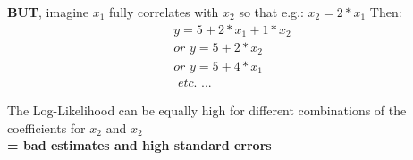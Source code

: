 \documentclass{beamer}
\begin{document}

\begin{frame}
    \frametitle{}
    \textbf{BUT}, imagine $x_1$ fully correlates with $x_2$ so that e.g.: $x_2 = 2 * x_1$ Then:
    \begin{equation*}
        \begin{aligned}
        y = 5 + 2 * x_1 + 1 * x_2 \\
        \textit{or } y = 5 + 2 * x_2 \\
        \textit{or } y = 5 + 4 * x_1 \\
        \textit{ etc. ...}
        \end{aligned}
    \end{equation*}
    \vspace{0.5cm}
    
    The Log-Likelihood can be equally high for different combinations of the coefficients for $x_2$ and $x_2$\\
    \textbf{= bad estimates and high standard errors}
\end{frame}
\end{document}
